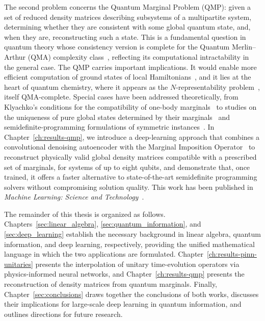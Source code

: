 The second problem concerns the Quantum Marginal Problem (QMP): given a set of reduced density matrices describing subsystems of a multipartite system, determining whether they are consistent with some global quantum state, and, when they are, reconstructing such a state. This is a fundamental question in quantum theory whose consistency version is complete for the Quantum Merlin--Arthur (QMA) complexity class~\cite{liu2006consistency, broadbent2022qma}, reflecting its computational intractability in the general case. The QMP carries important implications. It would enable more efficient computation of ground states of local Hamiltonians~\cite{liu2007nrep}, and it lies at the heart of quantum chemistry, where it appears as the $N$-representability problem~\cite{judd2001coulson}, itself QMA-complete. Special cases have been addressed theoretically, from Klyachko's conditions for the compatibility of one-body marginals~\cite{klyachko2004} to studies on the uniqueness of pure global states determined by their marginals~\cite{linden2002, diosi2004, wyderka2017} and semidefinite-programming formulations of symmetric instances~\cite{aloy2020}. In Chapter~\ref{ch:results-qmp}, we introduce a deep-learning approach that combines a convolutional denoising autoencoder with the Marginal Imposition Operator~\cite{uzcategui2022mio} to reconstruct physically valid global density matrices compatible with a prescribed set of marginals, for systems of up to eight qubits, and demonstrate that, once trained, it offers a faster alternative to state-of-the-art semidefinite programming solvers without compromising solution quality. This work has been published in \textit{Machine Learning: Science and Technology}~\cite{uzcategui2025marginals}.

The remainder of this thesis is organized as follows. Chapters~\ref{sec:linear_algebra}, \ref{sec:quantum_information}, and \ref{sec:deep_learning} establish the necessary background in linear algebra, quantum information, and deep learning, respectively, providing the unified mathematical language in which the two applications are formulated. Chapter~\ref{ch:results-pinn-unitaries} presents the interpolation of unitary time-evolution operators via physics-informed neural networks, and Chapter~\ref{ch:results-qmp} presents the reconstruction of density matrices from quantum marginals. Finally, Chapter~\ref{sec:conclusions} draws together the conclusions of both works, discusses their implications for large-scale deep learning in quantum information, and outlines directions for future research.
